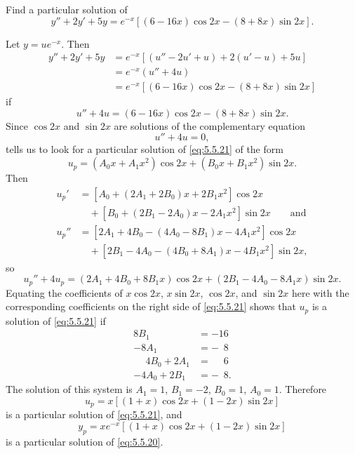 \begin{example}\label{example:5.5.6}
Find a particular solution of
\begin{equation} \label{eq:5.5.20}
y''+2y'+5y=e^{-x}\left[(6-16x)\cos2x-(8+8x)\sin2x\right].
\end{equation}
\end{example}

\begin{solution}
Let $y=ue^{-x}$. Then
\begin{align*}
y''+2y'+5y&=e^{-x}\left[(u''-2u'+u)+2(u'-u)+5u\right]\\
&=e^{-x}(u''+4u)\\
&=e^{-x}\left[(6-16x)\cos2x-(8+8x)\sin2x\right]
\end{align*}
if
\begin{equation} \label{eq:5.5.21}
u''+4u=(6-16x)\cos2x-(8+8x)\sin2x.
\end{equation}
Since $\cos2x$  and $\sin2x$ are solutions of
the complementary equation
\[
u''+4u=0,
\]
 tells us to look for a particular solution
of \eqref{eq:5.5.21} of the form
\[
u_p=(A_0x+A_1x^2)\cos2x+(B_0x+B_1x^2)\sin2x.
\]
Then
\begin{align*}
u_p'
&=\left[A_0+(2A_1+2B_0)x+2B_1x^2\right]\cos2x \\
&\quad{}+\left[B_0+(2B_1-2A_0)x-2A_1x^2\right]\sin2x\qquad\text{and}\\
u_p''
&=\left[2A_1+4B_0-(4A_0-8B_1)x-4A_1x^2\right]\cos2x\\
&\quad{}+\left[2B_1-4A_0-(4B_0+8A_1)x-4B_1x^2\right]\sin2x,
\end{align*}
so
\[
u_p''+4u_p=(2A_1+4B_0+8B_1x)\cos2x+(2B_1-4A_0-8A_1x)\sin2x.
\]
Equating the  coefficients of $x\cos2x$,
$x\sin2x$, $\cos2x$, and $\sin2x$  here with the
corresponding
coefficients on the right side of \eqref{eq:5.5.21} shows that $u_p$
is a solution of \eqref{eq:5.5.21} if
\begin{equation} \label{eq:5.5.22}
\begin{aligned}
8B_1&=-16\\
-8A_1&=-\phantom{1}8\\
\phantom{-}4B_0+2A_1&=\phantom{-1}6\\
-4A_0+2B_1&=-\phantom{1}8.
\end{aligned}
\end{equation}
The solution of this system is  $A_1=1$, $B_1=-2$, $B_0=1$, $A_0=1$.
Therefore
\[
u_p=x[(1+x)\cos2x+(1-2x)\sin2x]
\]
is a particular solution of  \eqref{eq:5.5.21}, and
\[
y_p=xe^{-x}\left[(1+x)\cos2x+(1-2x)\sin2x\right]
\]
is a particular solution of  \eqref{eq:5.5.20}. 
\end{solution}

